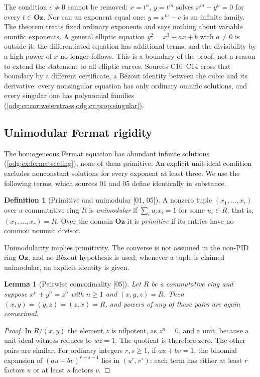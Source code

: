 \documentclass[11pt,oneside]{article}
\numberwithin{equation}{section}
\newtheorem{lemma}[lemma]{Lemma}
\theoremstyle{definition}
\newtheorem{definition}[definition]{Definition}
\theoremstyle{remark}
\newcommand{\Oz}{\mathbf{Oz}}
\newcommand{\src}[1]{\textup{\textsf{\small[#1]}}}
\begin{document}
The condition $c\ne0$ cannot be removed: $x=t^n$, $y=t^m$ solves
$x^m-y^n=0$ for every $t\in\Oz$. Nor can an exponent equal one: $y=x^m-c$ is
an infinite family. The theorem treats fixed ordinary exponents and says
nothing about variable omnific exponents. A general elliptic equation
$y^2=x^3+ax+b$ with $a\ne0$ is outside it: the differentiated equation has
additional terms, and the divisibility by a high power of $x$ no longer
follows. This is a boundary of the proof, not a reason to extend the
statement to all elliptic curves. Sources C10--C14 cross that boundary by a
different certificate, a B\'ezout identity between the cubic and its derivative:
every nonsingular equation has only ordinary omnific solutions, and every singular one
has polynomial families (\cref{odg:cr:cor:weierstrass,odg:cr:prop:singular}).

\subsection{Unimodular Fermat rigidity}\label{odg:sub:fermat}

The homogeneous Fermat equation has abundant infinite solutions
(\cref{odg:ex:fermatscaling}), none of them primitive. An explicit unit-ideal
condition excludes nonconstant solutions for every exponent at least three.
We use the following terms, which sources 01 and 05 define identically in
substance.

\begin{definition}[Primitive and unimodular \src{01, 05}]\label{odg:def:primitive}
A nonzero tuple $(x_1,\ldots,x_r)$ over a commutative ring $R$ is
\emph{unimodular} if $\sum_iu_ix_i=1$ for some $u_i\in R$, that is,
$(x_1,\ldots,x_r)=R$. Over the domain $\Oz$ it is \emph{primitive} if its
entries have no common nonunit divisor.
\end{definition}

Unimodularity implies primitivity. The converse is not assumed in the
non-PID ring $\Oz$, and no B\'ezout hypothesis is used; whenever a tuple is
claimed unimodular, an explicit identity is given.

\begin{lemma}[Pairwise comaximality \src{05}]\label{odg:lem:pairwise}
Let $R$ be a commutative ring and suppose $x^n+y^n=z^n$ with $n\ge1$ and
$(x,y,z)=R$. Then $(x,y)=(y,z)=(z,x)=R$, and powers of any of these pairs
are again comaximal.
\end{lemma}
\begin{proof}
In $R/(x,y)$ the element $z$ is nilpotent, as $z^n=0$, and a unit, because a
unit-ideal witness reduces to $wz=1$. The quotient is therefore zero. The
other pairs are similar. For ordinary integers $r,s\ge1$, if $au+bv=1$,
the binomial expansion of $(au+bv)^{r+s-1}$ lies in $(u^r,v^s)$: each term
has either at least $r$ factors $u$ or at least $s$ factors $v$.
\end{proof}
\end{document}
